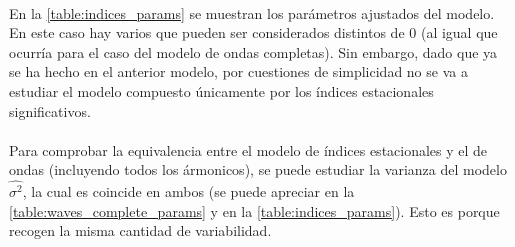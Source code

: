 \documentclass[a4paper, spanish]{article}
\begin{document}
    \paragraph{}
    En la \autoref{table:indices_params} se muestran los parámetros ajustados del modelo. En este caso hay varios que pueden ser considerados distintos de $0$ (al igual que ocurría para el caso del modelo de ondas completas). Sin embargo, dado que ya se ha hecho en el anterior modelo, por cuestiones de simplicidad no se va a estudiar el modelo compuesto únicamente por los índices estacionales significativos.

    \paragraph{}
    Para comprobar la equivalencia entre el modelo de índices estacionales y el de ondas (incluyendo todos los ármonicos), se puede estudiar la varianza del modelo $\widehat{\sigma^2}$, la cual es coincide en ambos (se puede apreciar en la \autoref{table:waves_complete_params} y en la  \autoref{table:indices_params}). Esto es porque recogen la misma cantidad de variabilidad.
\end{document}
